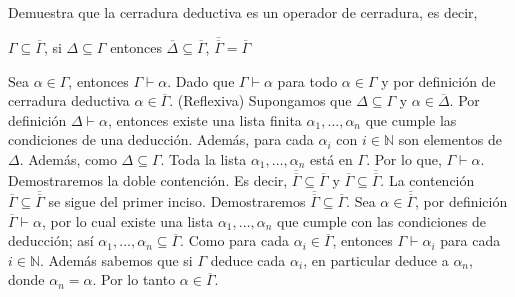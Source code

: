 \documentclass[fc]{tarea}
\begin{document}
\begin{exercise}
  Demuestra que la cerradura deductiva es un operador de cerradura, es decir,
  \begin{tasks}
    \task \(\Gamma\subseteq\overline{\Gamma}\),
    \task si \(\Delta\subseteq\Gamma\) entonces
      \(\overline{\Delta}\subseteq\overline{\Gamma}\),
    \task \(\overline{\overline{\Gamma}}=\overline{\Gamma}\)
  \end{tasks}
\end{exercise}
\begin{solution}
  \begin{tasks}
    \task Sea $\alpha \in \Gamma$, entonces $\Gamma \vdash \alpha$. Dado que $\Gamma \vdash \alpha$ para todo $\alpha \in \Gamma$ y por definición de cerradura
    deductiva $\alpha \in \overline{\Gamma}$. (Reflexiva)
    \task Supongamos que \(\Delta\subseteq\Gamma\) y $\alpha \in \overline{\Delta}$. Por definición $\Delta \vdash \alpha$, entonces existe una lista finita
   $\alpha_1,\ldots,\alpha_n$ que cumple las condiciones de una deducción. Además, para cada $\alpha_i$ con $i \in \mathbb{N}$ son elementos de $\Delta$. Además,
   como $\Delta \subseteq \Gamma$. Toda la lista $\alpha_1,\ldots,\alpha_n$ está en $\Gamma$. Por lo que, $\Gamma \vdash \alpha$.
   \task Demostraremos la doble contención. Es decir, \(\overline{\overline{\Gamma}} \subseteq \overline{\Gamma}\) y \(\overline{\Gamma} \subseteq \overline{\overline{\Gamma}}\).
   La contención \(\overline{\Gamma} \subseteq \overline{\overline{\Gamma}}\) se sigue del primer inciso. Demostraremos \(\overline{\overline{\Gamma}} \subseteq \overline{\Gamma}\).
    Sea $\alpha \in \overline{\overline{\Gamma}}$, por definición $\overline{\Gamma} \vdash \alpha$, por lo cual existe una lista $\alpha_1,\ldots,\alpha_n$ que cumple con
    las condiciones de deducción; así ${\alpha_1,\ldots,\alpha_n} \subseteq \overline{\Gamma}$. Como para cada $\alpha_i \in \overline{\Gamma}$, entonces $\Gamma \vdash \alpha_i$
    para cada $i \in \mathbb{N}$. Además sabemos que si $\Gamma$ deduce cada $\alpha_i$, en particular deduce a $\alpha_n$, donde $\alpha_n = \alpha$. Por lo tanto
    $\alpha \in \overline{\Gamma}$.
  \end{tasks}
\end{solution}
\end{document}
